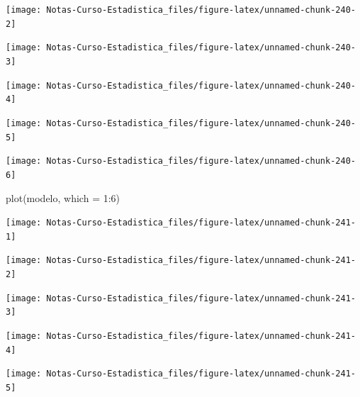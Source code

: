 \documentclass[
  12pt,
]{book}
\newenvironment{Shaded}{\begin{snugshade}}{\end{snugshade}}
\newcommand{\AttributeTok}[1]{\textcolor[rgb]{0.77,0.63,0.00}{#1}}
\newcommand{\DecValTok}[1]{\textcolor[rgb]{0.00,0.00,0.81}{#1}}
\newcommand{\FunctionTok}[1]{\textcolor[rgb]{0.00,0.00,0.00}{#1}}
\newcommand{\NormalTok}[1]{#1}
\newcommand{\SpecialCharTok}[1]{\textcolor[rgb]{0.00,0.00,0.00}{#1}}
\theoremstyle{definition}
\theoremstyle{definition}
\theoremstyle{definition}
\theoremstyle{remark}
\begin{document}
\begin{center}\texttt{[image: Notas-Curso-Estadistica\_files/figure-latex/unnamed-chunk-240-2]} \end{center}

\begin{center}\texttt{[image: Notas-Curso-Estadistica\_files/figure-latex/unnamed-chunk-240-3]} \end{center}

\begin{center}\texttt{[image: Notas-Curso-Estadistica\_files/figure-latex/unnamed-chunk-240-4]} \end{center}

\begin{center}\texttt{[image: Notas-Curso-Estadistica\_files/figure-latex/unnamed-chunk-240-5]} \end{center}

\begin{center}\texttt{[image: Notas-Curso-Estadistica\_files/figure-latex/unnamed-chunk-240-6]} \end{center}

\begin{Shaded}
\begin{Highlighting}[]
\FunctionTok{plot}\NormalTok{(modelo, }\AttributeTok{which =} \DecValTok{1}\SpecialCharTok{:}\DecValTok{6}\NormalTok{)}
\end{Highlighting}
\end{Shaded}

\begin{center}\texttt{[image: Notas-Curso-Estadistica\_files/figure-latex/unnamed-chunk-241-1]} \end{center}

\begin{center}\texttt{[image: Notas-Curso-Estadistica\_files/figure-latex/unnamed-chunk-241-2]} \end{center}

\begin{center}\texttt{[image: Notas-Curso-Estadistica\_files/figure-latex/unnamed-chunk-241-3]} \end{center}

\begin{center}\texttt{[image: Notas-Curso-Estadistica\_files/figure-latex/unnamed-chunk-241-4]} \end{center}

\begin{center}\texttt{[image: Notas-Curso-Estadistica\_files/figure-latex/unnamed-chunk-241-5]} \end{center}
\end{document}
